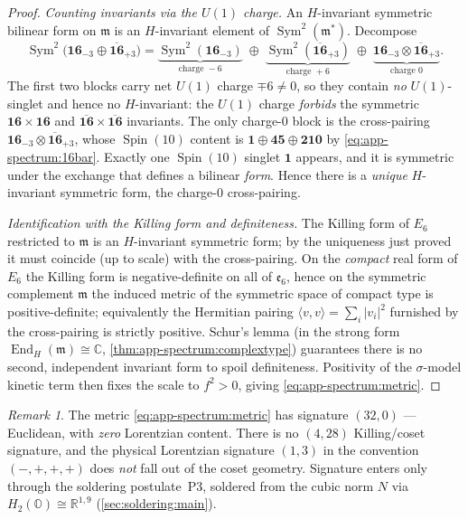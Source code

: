 \documentclass[11pt]{article}
\theoremstyle{plain}
\theoremstyle{definition}
\theoremstyle{remark}
\newtheorem{remark}[theorem]{Remark}
\newcommand{\Spin}{\operatorname{Spin}}
\newcommand{\End}{\operatorname{End}}
\newcommand{\Sym}{\operatorname{Sym}}
\begin{document}
\begin{proof}
\emph{Counting invariants via the $U(1)$ charge.} An $H$-invariant
symmetric bilinear form on $\mathfrak m$ is an $H$-invariant element of
$\Sym^2(\mathfrak m^\ast)$. Decompose
\[
  \Sym^2\bigl(\mathbf{16}_{-3}\oplus\overline{\mathbf{16}}_{+3}\bigr)
   = \underbrace{\Sym^2(\mathbf{16}_{-3})}_{\text{charge }-6}
   \;\oplus\;
   \underbrace{\Sym^2(\overline{\mathbf{16}}_{+3})}_{\text{charge }+6}
   \;\oplus\;
   \underbrace{\mathbf{16}_{-3}\otimes\overline{\mathbf{16}}_{+3}}_{\text{charge }0}.
\]
The first two blocks carry net $U(1)$ charge $\mp6\neq0$, so they contain
\emph{no} $U(1)$-singlet and hence no $H$-invariant: the $U(1)$ charge
\emph{forbids} the symmetric $\mathbf{16}\times\mathbf{16}$ and
$\overline{\mathbf{16}}\times\overline{\mathbf{16}}$ invariants. The only
charge-$0$ block is the cross-pairing
$\mathbf{16}_{-3}\otimes\overline{\mathbf{16}}_{+3}$, whose $\Spin(10)$
content is $\mathbf 1\oplus\mathbf{45}\oplus\mathbf{210}$ by
\eqref{eq:app-spectrum:16bar}. Exactly one $\Spin(10)$ singlet $\mathbf 1$
appears, and it is symmetric under the exchange that defines a bilinear
\emph{form}. Hence there is a \emph{unique} $H$-invariant symmetric form,
the charge-$0$ cross-pairing.

\emph{Identification with the Killing form and definiteness.} The Killing
form of $E_6$ restricted to $\mathfrak m$ is an $H$-invariant symmetric
form; by the uniqueness just proved it must coincide (up to scale) with
the cross-pairing. On the \emph{compact} real form of $E_6$ the Killing
form is negative-definite on all of $\mathfrak e_6$, hence on the symmetric
complement $\mathfrak m$ the induced metric of the symmetric space of
compact type is positive-definite; equivalently the Hermitian pairing
$\langle v,v\rangle=\sum_i|v_i|^2$ furnished by the cross-pairing is
strictly positive. Schur's lemma (in the strong form
$\End_H(\mathfrak m)\cong\mathbb C$, \autoref{thm:app-spectrum:complextype})
guarantees there is no second, independent invariant form to spoil
definiteness. Positivity of the $\sigma$-model kinetic term then fixes the
scale to $f^2>0$, giving \eqref{eq:app-spectrum:metric}.
\end{proof}

\begin{remark}\label{rem:app-spectrum:nolorentz}
The metric \eqref{eq:app-spectrum:metric} has signature $(32,0)$ ---
Euclidean, with \emph{zero} Lorentzian content. There is no $(4,28)$
Killing/coset signature, and the physical Lorentzian signature $(1,3)$ in
the convention $(-,+,+,+)$ does \emph{not} fall out of the coset geometry.
Signature enters only through the soldering postulate~P3, soldered from the
cubic norm $N$ via $H_2(\mathbb O)\cong\mathbb R^{1,9}$
(\autoref{sec:soldering:main}).
\end{remark}
\end{document}
